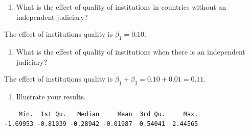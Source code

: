 \documentclass[]{article}
\newenvironment{Shaded}{\begin{snugshade}}{\end{snugshade}}
\newcommand{\KeywordTok}[1]{\textcolor[rgb]{0.13,0.29,0.53}{\textbf{#1}}}
\newcommand{\CommentTok}[1]{\textcolor[rgb]{0.56,0.35,0.01}{\textit{#1}}}
\newcommand{\OperatorTok}[1]{\textcolor[rgb]{0.81,0.36,0.00}{\textbf{#1}}}
\newcommand{\NormalTok}[1]{#1}
\providecommand{\tightlist}{%
  \setlength{\itemsep}{0pt}\setlength{\parskip}{0pt}}
\theoremstyle{definition}
\theoremstyle{definition}
\theoremstyle{definition}
\theoremstyle{remark}
\begin{document}
\begin{enumerate}
\def\labelenumi{\alph{enumi}.}
\tightlist
\item
  What is the effect of quality of institutions in countries without an
  independent judiciary?
\end{enumerate}

The effect of institutions quality is \(\beta_1 = 0.10\).

\begin{enumerate}
\def\labelenumi{\alph{enumi}.}
\setcounter{enumi}{1}
\tightlist
\item
  What is the effect of quality of institutions when there is an
  independent judiciary?
\end{enumerate}

The effect of institutions quality is
\(\beta_1 + \beta_3 = 0.10 + 0.01 = 0.11\).

\begin{enumerate}
\def\labelenumi{\alph{enumi}.}
\setcounter{enumi}{2}
\tightlist
\item
  Illustrate your results.
\end{enumerate}

\begin{Shaded}
\end{Shaded}

\begin{verbatim}
    Min.  1st Qu.   Median     Mean  3rd Qu.     Max. 
-1.69953 -0.81039 -0.28942 -0.01987  0.54041  2.44565 
\end{verbatim}
\end{document}
